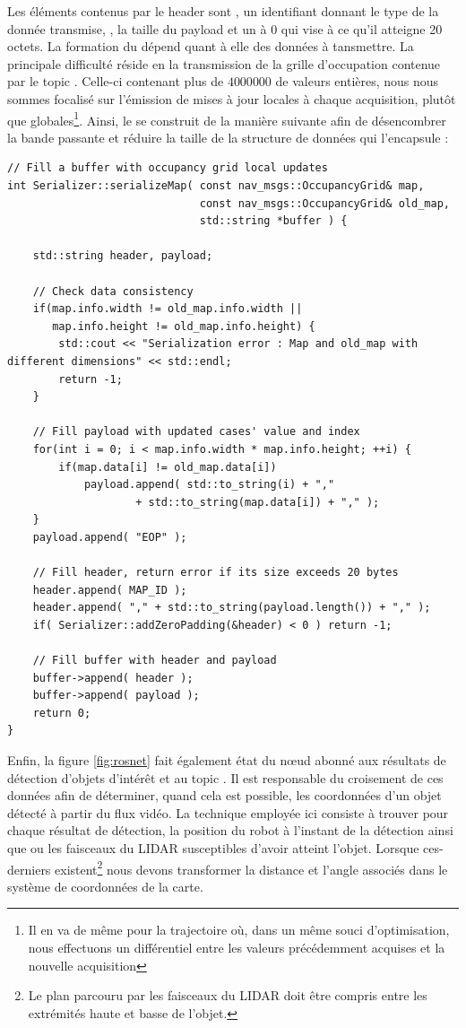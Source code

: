 Les éléments contenus par le header sont , un identifiant donnant le type de la donnée transmise, , la taille du payload et un  à $0$ qui vise à ce qu'il atteigne 20 octets. 
La formation du  dépend quant à elle des données à tansmettre. 
La principale difficulté réside en la transmission de la grille d'occupation contenue par le topic . 
Celle-ci contenant plus de $4 000 000$ de valeurs entières, nous nous sommes focalisé sur l'émission de mises à jour locales à chaque acquisition, plutôt que globales\footnote{Il en va de même pour la trajectoire où,
dans un même souci d'optimisation, nous effectuons un différentiel entre les valeurs précédemment acquises et la nouvelle acquisition}. 
Ainsi, le  se construit de la manière suivante afin de désencombrer la bande passante et réduire la taille de la structure de données qui l'encapsule :

\begin{lstlisting}[style = customcpp]
// Fill a buffer with occupancy grid local updates
int Serializer::serializeMap( const nav_msgs::OccupancyGrid& map, 
							  const nav_msgs::OccupancyGrid& old_map, 
							  std::string *buffer ) {
	
	std::string header, payload; 
	
	// Check data consistency  
	if(map.info.width != old_map.info.width || 
	   map.info.height != old_map.info.height) {
		std::cout << "Serialization error : Map and old_map with different dimensions" << std::endl; 
		return -1; 
	}	
	
	// Fill payload with updated cases' value and index
	for(int i = 0; i < map.info.width * map.info.height; ++i) {
		if(map.data[i] != old_map.data[i])	
		    payload.append( std::to_string(i) + ","
				    + std::to_string(map.data[i]) + "," );	
	}	
	payload.append( "EOP" );
	
	// Fill header, return error if its size exceeds 20 bytes
	header.append( MAP_ID );
	header.append( "," + std::to_string(payload.length()) + "," );
	if( Serializer::addZeroPadding(&header) < 0 ) return -1; 
	
	// Fill buffer with header and payload 
	buffer->append( header );
	buffer->append( payload );	
	return 0; 
}
\end{lstlisting}

Enfin, la figure \ref{fig:rosnet} fait également état du n\oe{}ud  abonné aux résultats de détection d'objets d'intérêt et au topic .
Il est responsable du croisement de ces données afin de déterminer, quand cela est possible, les coordonnées d'un objet détecté à partir du flux vidéo.  
La technique employée ici consiste à trouver pour chaque résultat de détection, la position du robot à l'instant de la détection ainsi que ou les faisceaux du LIDAR susceptibles d'avoir atteint l'objet. 
Lorsque ces-derniers existent\footnote{Le plan parcouru par les faisceaux du LIDAR doit être compris entre les extrémités haute et basse de l'objet.} 
nous devons transformer la distance et l'angle associés dans le système de coordonnées de la carte. 

